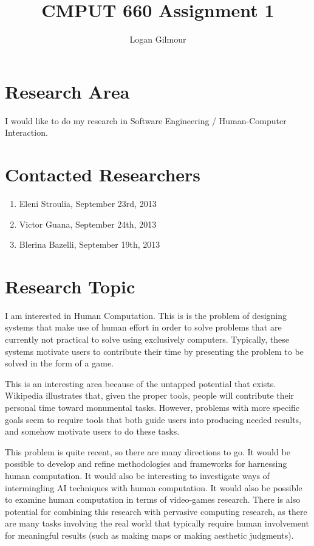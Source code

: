 \documentclass{article}
\begin{document}
\title{CMPUT 660 Assignment 1}
\author{Logan Gilmour}

\maketitle


\section{Research Area}
I would like to do my research in Software Engineering / Human-Computer Interaction.

\section{Contacted Researchers}
\begin{enumerate}

  \item Eleni Stroulia, September 23rd, 2013
  \item Victor Guana, September 24th, 2013 
  \item Blerina Bazelli, September 19th, 2013

\end{enumerate}


\section{Research Topic}

I am interested in Human Computation. This is is the problem of designing systems that make use of human effort in order to solve problems that are currently not practical to solve using exclusively computers. Typically, these systems motivate users to contribute their time by presenting the problem to be solved in the form of a game.

This is an interesting area because of the untapped potential that exists. Wikipedia illustrates that, given the proper tools, people will contribute their personal time toward monumental tasks. However, problems with more specific goals seem to require tools that both guide users into producing needed results, and somehow motivate users to do these tasks.

This problem is quite recent, so there are many directions to go. It would be possible to develop and refine methodologies and frameworks for harnessing human computation. It would also be interesting to investigate ways of intermingling AI techniques with human computation. It would also be possible to examine human computation in terms of video-games research. There is also potential for combining this research with pervasive computing research, as there are many tasks involving the real world that typically require human involvement for meaningful results (such as making maps or making aesthetic judgments). 
\end{document}
